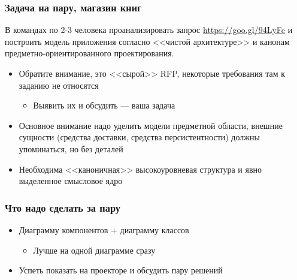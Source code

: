 \documentclass{../../slides-style}
\begin{document}
    
    \begin{frame}[plain]
        \titlepage
    \end{frame}

    \begin{frame}
        \frametitle{Задача на пару, магазин книг}
        В командах по 2-3 человека проанализировать запрос \url{https://goo.gl/94LyFc} и построить модель приложения согласно <<чистой архитектуре>> и канонам предметно-ориентированного проектирования.
        \begin{itemize}
            \item Обратите внимание, это <<сырой>> RFP, некоторые требования там к заданию не относятся
            \begin{itemize}
                \item Выявить их и обсудить --- ваша задача
            \end{itemize}
            \item Основное внимание надо уделить модели предметной области, внешние сущности (средства доставки, средства персистентности) должны упоминаться, но без деталей
            \item Необходима <<каноничная>> высокоуровневая структура и явно выделенное смысловое ядро
        \end{itemize}
    \end{frame}

    \begin{frame}
        \frametitle{Что надо сделать за пару}
        \begin{itemize}
            \item Диаграмму компонентов + диаграмму классов
            \begin{itemize}
                \item Лучше на одной диаграмме сразу
            \end{itemize}
            \item Успеть показать на проекторе и обсудить пару решений
        \end{itemize}
    \end{frame}
\end{document}
